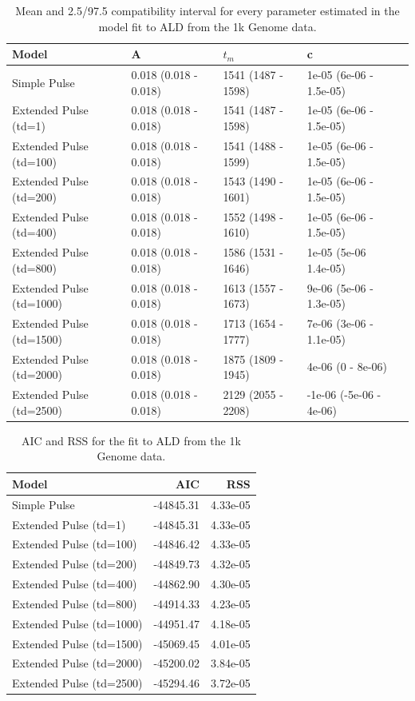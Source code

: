 \documentclass[11pt]{article}
\begin{document}
\begin{table}[H]
\caption{\label{tab:tableSReal_data_est} Mean and 2.5/97.5 compatibility interval for every parameter estimated in the model fit to ALD from the 1k Genome data.}
\centering
\begin{tabular}[t]{l|l|l|l|l}
\hline
Model & A & $t_m$ & c\\
\hline
Simple Pulse & 0.018 (0.018 - 0.018) & 1541 (1487 - 1598) & 1e-05 (6e-06 - 1.5e-05)\\
\hline
Extended Pulse (td=1) & 0.018 (0.018 - 0.018) & 1541 (1487 - 1598) & 1e-05 (6e-06 - 1.5e-05)\\
\hline
Extended Pulse (td=100) & 0.018 (0.018 - 0.018) & 1541 (1488 - 1599) & 1e-05 (6e-06 - 1.5e-05)\\
\hline
Extended Pulse (td=200) & 0.018 (0.018 - 0.018) & 1543 (1490 - 1601) & 1e-05 (6e-06 - 1.5e-05)\\
\hline
Extended Pulse (td=400) & 0.018 (0.018 - 0.018) & 1552 (1498 - 1610) & 1e-05 (6e-06 - 1.5e-05)\\
\hline
Extended Pulse (td=800) & 0.018 (0.018 - 0.018) & 1586 (1531 - 1646) & 1e-05 (5e-06 1.4e-05)\\
\hline
Extended Pulse (td=1000) & 0.018 (0.018 - 0.018) & 1613 (1557 - 1673) & 9e-06 (5e-06 - 1.3e-05)\\
\hline
Extended Pulse (td=1500) &  0.018 (0.018 - 0.018) & 1713 (1654 - 1777) & 7e-06 (3e-06 - 1.1e-05)\\
\hline
Extended Pulse (td=2000) & 0.018 (0.018 - 0.018) & 1875 (1809 - 1945) & 4e-06 (0 - 8e-06)\\
\hline
Extended Pulse (td=2500) & 0.018 (0.018 - 0.018) & 2129 (2055 - 2208) & -1e-06 (-5e-06 - 4e-06)\\
\hline
\end{tabular}
\end{table}

\begin{table}[H]

\caption{\label{tab:tableSReadl_data_AIC_F_Test} AIC and RSS for the fit  to ALD from the 1k Genome data.}
\centering
\begin{tabular}[t]{l|r|r}
\hline
Model & AIC & RSS\\
\hline
Simple Pulse & -44845.31 & 4.33e-05\\
\hline
Extended Pulse (td=1) & -44845.31 & 4.33e-05\\
\hline
Extended Pulse (td=100) & -44846.42 & 4.33e-05\\
\hline
Extended Pulse (td=200) & -44849.73 & 4.32e-05\\
\hline
Extended Pulse (td=400) & -44862.90 & 4.30e-05\\
\hline
Extended Pulse (td=800) & -44914.33 & 4.23e-05\\
\hline
Extended Pulse (td=1000) & -44951.47 & 4.18e-05\\
\hline
Extended Pulse (td=1500) & -45069.45 & 4.01e-05\\
\hline
Extended Pulse (td=2000) & -45200.02 & 3.84e-05\\
\hline
Extended Pulse (td=2500) & -45294.46 & 3.72e-05\\
\hline
\end{tabular}
\end{table}
\end{document}

